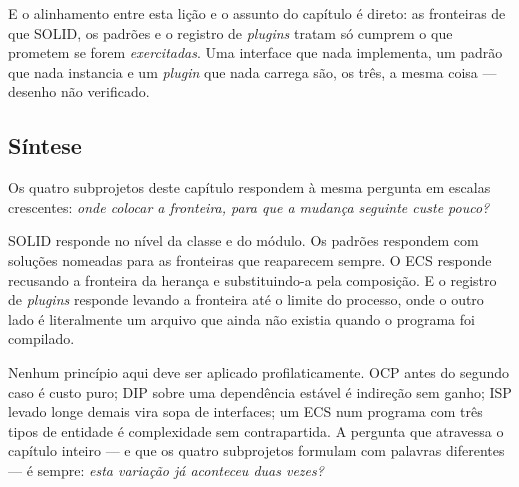 E o alinhamento entre esta lição e o assunto do capítulo é direto: as fronteiras
de que SOLID, os padrões e o registro de \emph{plugins} tratam só cumprem o que
prometem se forem \emph{exercitadas}. Uma interface que nada implementa, um
padrão que nada instancia e um \emph{plugin} que nada carrega são, os três, a
mesma coisa --- desenho não verificado.

\subsection{Síntese}

Os quatro subprojetos deste capítulo respondem à mesma pergunta em escalas
crescentes: \emph{onde colocar a fronteira, para que a mudança seguinte custe
pouco?}

SOLID responde no nível da classe e do módulo. Os padrões respondem com soluções
nomeadas para as fronteiras que reaparecem sempre. O ECS responde recusando a
fronteira da herança e substituindo-a pela composição. E o registro de
\emph{plugins} responde levando a fronteira até o limite do processo, onde o
outro lado é literalmente um arquivo que ainda não existia quando o programa foi
compilado.

\begin{armadilha}
Nenhum princípio aqui deve ser aplicado profilaticamente. OCP antes do segundo
caso é custo puro; DIP sobre uma dependência estável é indireção sem ganho; ISP
levado longe demais vira sopa de interfaces; um ECS num programa com três tipos
de entidade é complexidade sem contrapartida. A pergunta que atravessa o
capítulo inteiro --- e que os quatro subprojetos formulam com palavras
diferentes --- é sempre: \emph{esta variação já aconteceu duas vezes?}
\end{armadilha}
